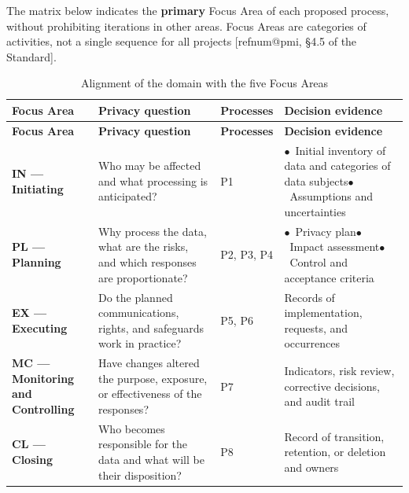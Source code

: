 \documentclass[12pt,a4paper,article,oneside,brazil,english]{abntex2}
\makeatletter
\newcommand{\fontetab}[1]{\par\vspace{3pt}{\small\noindent Source: #1\par}}
\newcommand{\refnum}[1]{\csname refnum@#1\endcsname}
\makeatother
\begin{document}
The matrix below indicates the \textbf{primary} Focus Area of each proposed process, without prohibiting iterations in other areas. Focus Areas are categories of activities, not a single sequence for all projects [\refnum{pmi}, §4.5 of the Standard].

\begingroup\SingleSpacing\footnotesize
\begin{longtable}{@{}>{\raggedright\arraybackslash}p{}>{\raggedright\arraybackslash}p{}>{\raggedright\arraybackslash}p{}>{\raggedright\arraybackslash}p{}@{}}
\caption{Alignment of the domain with the five Focus Areas}\label{tab:t8}\\
\hline
\textbf{Focus Area} & \textbf{Privacy question} & \textbf{Processes} & \textbf{Decision evidence}\\
\hline
\endfirsthead
\hline
\textbf{Focus Area} & \textbf{Privacy question} & \textbf{Processes} & \textbf{Decision evidence}\\
\hline
\endhead
\hline
\endfoot
\hline
\endlastfoot
\textbf{IN — Initiating} & Who may be affected and what processing is anticipated? & P1 & $\bullet$~Initial inventory of data and categories of data subjects\newline$\bullet$~Assumptions and uncertainties\\[3pt]
\textbf{PL — Planning} & Why process the data, what are the risks, and which responses are proportionate? & P2, P3, P4 & $\bullet$~Privacy plan\newline$\bullet$~Impact assessment\newline$\bullet$~Control and acceptance criteria\\[3pt]
\textbf{EX — Executing} & Do the planned communications, rights, and safeguards work in practice? & P5, P6 & Records of implementation, requests, and occurrences\\[3pt]
\textbf{MC — Monitoring and Controlling} & Have changes altered the purpose, exposure, or effectiveness of the responses? & P7 & Indicators, risk review, corrective decisions, and audit trail\\[3pt]
\textbf{CL — Closing} & Who becomes responsible for the data and what will be their disposition? & P8 & Record of transition, retention, or deletion and owners\\[3pt]
\end{longtable}
\endgroup
\fontetab{Prepared by the authors (2026).}
\end{document}
